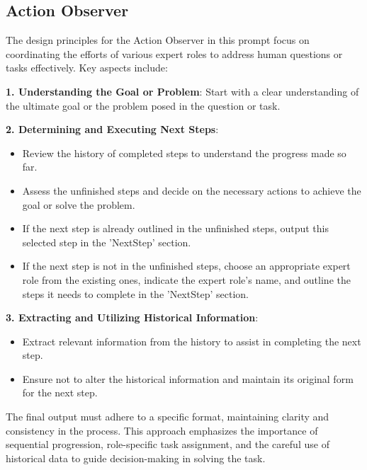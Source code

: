 \subsection{Action Observer}

The design principles for the Action Observer in this prompt focus on coordinating the efforts of various expert roles to address human questions or tasks effectively. Key aspects include:

\textbf{1. Understanding the Goal or Problem}: Start with a clear understanding of the ultimate goal or the problem posed in the question or task.

\textbf{2. Determining and Executing Next Steps}:

\begin{itemize}
    \item Review the history of completed steps to understand the progress made so far.
    \item Assess the unfinished steps and decide on the necessary actions to achieve the goal or solve the problem.
    \item If the next step is already outlined in the unfinished steps, output this selected step in the 'NextStep' section.
    \item If the next step is not in the unfinished steps, choose an appropriate expert role from the existing ones, indicate the expert role's name, and outline the steps it needs to complete in the 'NextStep' section.
\end{itemize}

\textbf{3. Extracting and Utilizing Historical Information}:
\begin{itemize}
    \item Extract relevant information from the history to assist in completing the next step.
    \item Ensure not to alter the historical information and maintain its original form for the next step.
\end{itemize}

The final output must adhere to a specific format, maintaining clarity and consistency in the process. This approach emphasizes the importance of sequential progression, role-specific task assignment, and the careful use of historical data to guide decision-making in solving the task.

